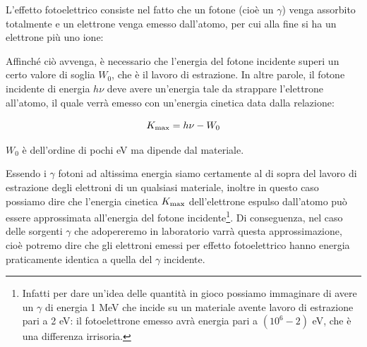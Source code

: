 L'effetto fotoelettrico consiste nel fatto che un fotone (cioè un $\gamma$) venga assorbito totalmente e un elettrone venga emesso dall'atomo, per cui alla fine si ha un elettrone più uno ione:

\begin{figure}[H]
    \centering
\end{figure}

Affinché ciò avvenga, è necessario che l'energia del fotone incidente superi un certo valore di soglia $W_0$, che è il lavoro di estrazione. In altre parole, il fotone incidente di energia $h\nu$ deve avere un'energia tale da strappare l'elettrone all'atomo, il quale verrà emesso con un'energia cinetica data dalla relazione:

\begin{equation*}
    K_{\rm max}=h\nu - W_0
\end{equation*}

$W_0$ è dell'ordine di pochi eV ma dipende dal materiale.

Essendo i $\gamma$ fotoni ad altissima energia siamo certamente al di sopra del lavoro di estrazione degli elettroni di un qualsiasi materiale, inoltre in questo caso possiamo dire che l'energia cinetica $K_{\rm max}$ dell'elettrone espulso dall'atomo può essere approssimata all'energia del fotone incidente\footnote{Infatti per dare un'idea delle quantità in gioco possiamo immaginare di avere un $\gamma$ di energia 1 MeV che incide su un materiale avente lavoro di estrazione pari a 2 eV: il fotoelettrone emesso avrà energia pari a $(10^6 - 2)$ eV, che è una differenza irrisoria.}. Di conseguenza, nel caso delle sorgenti $\gamma$ che adopereremo in laboratorio varrà questa approssimazione, cioè potremo dire che gli elettroni emessi per effetto fotoelettrico hanno energia praticamente identica a quella del $\gamma$ incidente.

